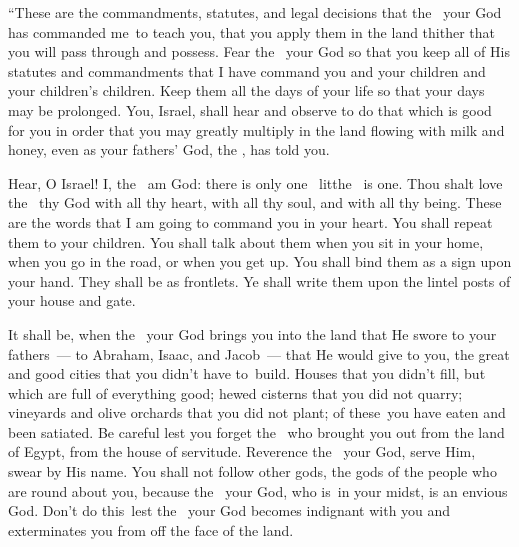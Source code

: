 
\begin{inparaenum}
   ``These are the commandments, statutes, and legal decisions that the \lord\ your God has commanded me\understood{}\ to teach you, that you apply them in the land thither that you will pass through and possess.%
   Fear the \lord\ your God so that you keep all of His statutes and commandments that I have command you and your children and your children's children. Keep them all the days of your life so that your days may be prolonged.%
   You, Israel, shall hear and observe to do that which is good for you in order that you may greatly multiply in the land flowing with milk and honey, even as your fathers' God, the \lord, has told you.%

   Hear, O Israel! I, the \lord\ am God: there is only one \lord\ lit{the \lord\ is one}.%
   Thou shalt love the \lord\ thy God with all thy heart, with all thy soul, and with all thy being.%
   These are the words that I am going to command you in your heart.%
   You shall repeat them to your children. You shall talk about them when you sit in your home, when you go in the road, or when you get up.%
   You shall bind them as a sign upon your hand. They shall be as frontlets.%
   Ye shall write them upon the lintel posts of your house and gate.%

   It shall be, when the \lord\ your God brings you into the land that He swore to your fathers~--- to Abraham, Isaac, and Jacob~--- that He would give to you, the great and good cities that you didn't have to\understood{}\ build.%
   Houses that you didn't fill, but which are full of everything good; hewed cisterns that you did not quarry; vineyards and olive orchards that you did not plant; of these\understood{}\ you have eaten and been satiated.%
   Be careful lest you forget the \lord\ who brought you out from the land of Egypt, from the house of servitude.%
   Reverence the \lord\ your God, serve Him, swear by His name.%
   You shall not follow other gods, the gods of the people who are round about you,%
   because the \lord\ your God, who is\understood{}\ in your midst, is an envious God. Don't do this\understood{}\ lest the \lord\ your God becomes indignant with you and exterminates you from off the face of the land.%


\end{inparaenum}
